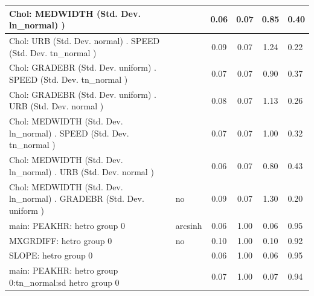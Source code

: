 \begin{table}
\begin{center}
\begin{tabular}{|l|l|c|c|c|l|}
			\hline
			 Chol: MEDWIDTH (Std. Dev. ln_normal) ) &  & 0.06 & 0.07 & 0.85 & 0.40 \\
			\hline
			 Chol: URB (Std. Dev. normal) . SPEED (Std. Dev.   tn_normal ) &  & 0.09 & 0.07 & 1.24 & 0.22 \\
			\hline
			 Chol: GRADEBR (Std. Dev. uniform) . SPEED (Std. Dev.   tn_normal ) &  & 0.07 & 0.07 & 0.90 & 0.37 \\
			\hline
			 Chol: GRADEBR (Std. Dev. uniform) . URB (Std. Dev.   normal ) &  & 0.08 & 0.07 & 1.13 & 0.26 \\
			\hline
			 Chol: MEDWIDTH (Std. Dev. ln_normal) . SPEED (Std. Dev.   tn_normal ) &  & 0.07 & 0.07 & 1.00 & 0.32 \\
			\hline
			 Chol: MEDWIDTH (Std. Dev. ln_normal) . URB (Std. Dev.   normal ) &  & 0.06 & 0.07 & 0.80 & 0.43 \\
			\hline
			 Chol: MEDWIDTH (Std. Dev. ln_normal) . GRADEBR (Std. Dev.   uniform ) & no & 0.09 & 0.07 & 1.30 & 0.20 \\
			\hline
			main: PEAKHR: hetro group 0 & arcsinh & 0.06 & 1.00 & 0.06 & 0.95 \\
			\hline
			MXGRDIFF: hetro group 0 & no & 0.10 & 1.00 & 0.10 & 0.92 \\
			\hline
			SLOPE: hetro group 0 &  & 0.06 & 1.00 & 0.06 & 0.95 \\
			\hline
			main: PEAKHR: hetro group 0:tn_normal:sd  hetro group 0 &  & 0.07 & 1.00 & 0.07 & 0.94 \\
			\hline
		\end{tabular}
	\end{center}
\end{table}